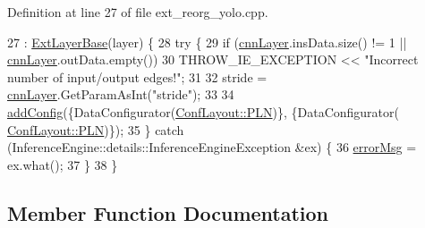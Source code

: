 Definition at line 27 of file ext\+\_\+reorg\+\_\+yolo.\+cpp.


\begin{DoxyCode}
27                                                  : \hyperlink{classInferenceEngine_1_1Extensions_1_1Cpu_1_1ExtLayerBase_affff0e8263ca26852ccf71d299d7b06a}{ExtLayerBase}(layer) \{
28         \textcolor{keywordflow}{try} \{
29             \textcolor{keywordflow}{if} (\hyperlink{classInferenceEngine_1_1Extensions_1_1Cpu_1_1ExtLayerBase_a1074cdccacb9e9ca6eec01bbc2f7ca4a}{cnnLayer}.insData.size() != 1 || \hyperlink{classInferenceEngine_1_1Extensions_1_1Cpu_1_1ExtLayerBase_a1074cdccacb9e9ca6eec01bbc2f7ca4a}{cnnLayer}.outData.empty())
30                 THROW\_IE\_EXCEPTION << \textcolor{stringliteral}{"Incorrect number of input/output edges!"};
31 
32             stride = \hyperlink{classInferenceEngine_1_1Extensions_1_1Cpu_1_1ExtLayerBase_a1074cdccacb9e9ca6eec01bbc2f7ca4a}{cnnLayer}.GetParamAsInt(\textcolor{stringliteral}{"stride"});
33 
34             \hyperlink{classInferenceEngine_1_1Extensions_1_1Cpu_1_1ExtLayerBase_a0ac7a6632e95b9500d5246b05b4b0bfa}{addConfig}(\{DataConfigurator(\hyperlink{classInferenceEngine_1_1Extensions_1_1Cpu_1_1ExtLayerBase_a1258a8d209e0249e0b1717618352ddfba446687ea2db1ada75be5ed053be77f59}{ConfLayout::PLN})\}, \{DataConfigurator(
      \hyperlink{classInferenceEngine_1_1Extensions_1_1Cpu_1_1ExtLayerBase_a1258a8d209e0249e0b1717618352ddfba446687ea2db1ada75be5ed053be77f59}{ConfLayout::PLN})\});
35         \} \textcolor{keywordflow}{catch} (InferenceEngine::details::InferenceEngineException &ex) \{
36             \hyperlink{classInferenceEngine_1_1Extensions_1_1Cpu_1_1ExtLayerBase_abc78e9b5a79fa339ffd831a5318f71f7}{errorMsg} = ex.what();
37         \}
38     \}
\end{DoxyCode}


\subsection{Member Function Documentation}

